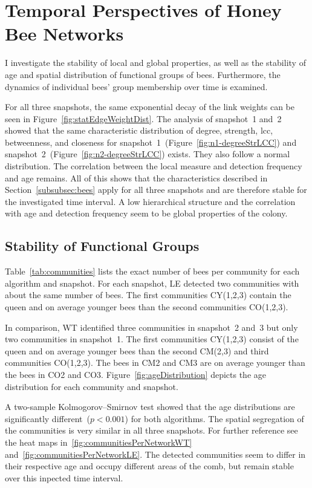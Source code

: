 \section{Temporal Perspectives of Honey Bee Networks}
\label{sec:temporalresults}
I investigate the stability of local and global properties, as well as the stability of age and spatial distribution of functional groups of bees.
Furthermore, the dynamics of individual bees' group membership over time is examined.

For all three snapshots, the same exponential decay of the link weights can be seen in Figure~\ref{fig:statEdgeWeightDist}.
The analysis of snapshot~1 and~2 showed that the same characteristic distribution of degree, strength, lcc, betweenness, and closeness for snapshot~1~(Figure~\ref{fig:n1-degreeStrLCC}) and snapshot~2~(Figure~\ref{fig:n2-degreeStrLCC}) exists. They also follow a normal distribution. The correlation between the local measure and detection frequency and age remains.
All of this shows that the characteristics described in Section~\ref{subsubsec:bees} apply for all three snapshots and are therefore stable for the investigated time interval. A low hierarchical structure and the correlation with age and detection frequency seem to be global properties of the colony.

\subsection{Stability of Functional Groups}
Table~\ref{tab:communities} lists the exact number of bees per community for each algorithm and snapshot.
For each snapshot, LE detected two communities with about the same number of bees.
The first communities CY(1,2,3) contain the queen and on average younger bees than the second communities CO(1,2,3).

In comparison, WT identified three communities in snapshot~2 and~3 but only two communities in snapshot~1.
The first communities CY(1,2,3) consist of the queen and on average younger bees than the second CM(2,3) and third communities CO(1,2,3).
The bees in CM2 and CM3 are on average younger than the bees in CO2 and CO3.
Figure~\ref{fig:ageDistribution} depicts the age distribution for each community and snapshot.

A two-sample Kolmogorov–Smirnov test showed that the age distributions are significantly different~($p< 0.001$) for both algorithms.
The spatial segregation of the communities is very similar in all three snapshots. For further reference see the heat maps in~\ref{fig:communitiesPerNetworkWT} and~\ref{fig:communitiesPerNetworkLE}.
The detected communities seem to differ in their respective age and occupy different areas of the comb, but remain stable over this inpected time interval.

